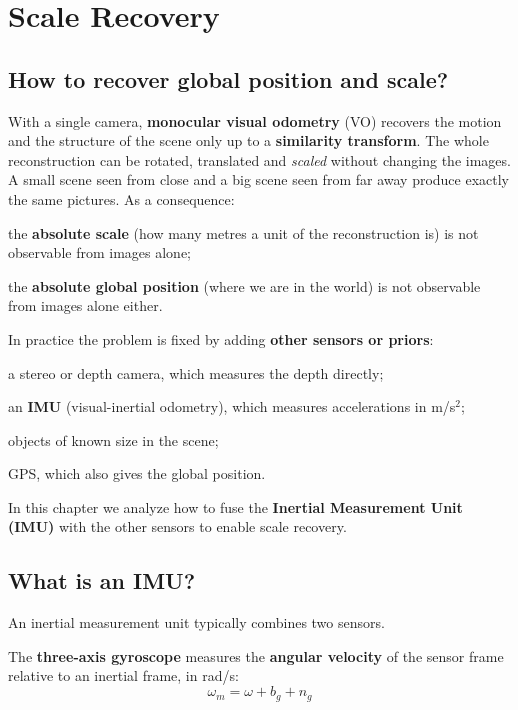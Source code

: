 \section{Scale Recovery}

\subsection{How to recover global position and scale?}
With a single camera, \textbf{monocular visual odometry} (VO) recovers the motion and the structure of the scene only up to a \textbf{similarity transform}. The whole reconstruction can be rotated, translated and \emph{scaled} without changing the images. A small scene seen from close and a big scene seen from far away produce exactly the same pictures. As a consequence:
\begin{compactitemize}
    \item the \textbf{absolute scale} (how many metres a unit of the reconstruction is) is not observable from images alone;
    \item the \textbf{absolute global position} (where we are in the world) is not observable from images alone either.
\end{compactitemize}

In practice the problem is fixed by adding \textbf{other sensors or priors}:
\begin{compactitemize}
    \item a stereo or depth camera, which measures the depth directly;
    \item an \textbf{IMU} (visual-inertial odometry), which measures accelerations in m/s$^2$;
    \item objects of known size in the scene;
    \item GPS, which also gives the global position.
\end{compactitemize}
In this chapter we analyze how to fuse the \textbf{Inertial Measurement Unit (IMU)} with the other sensors to enable scale recovery.

\subsection{What is an IMU?}
An inertial measurement unit typically combines two sensors.

The \textbf{three-axis gyroscope} measures the \textbf{angular velocity} of the sensor frame relative to an inertial frame, in rad/s:
\[
\omega_m = \omega + b_g + n_g
\]

